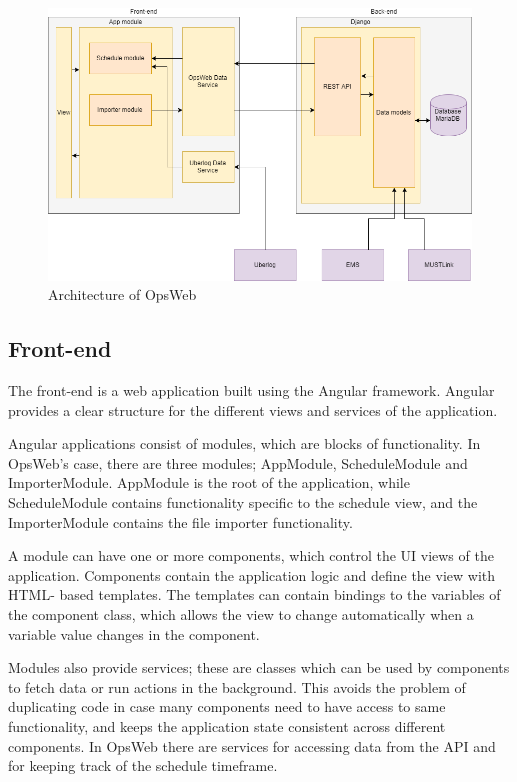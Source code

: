 \begin{figure}[ht]
  \begin{center}
    \includegraphics*[width=1\textwidth]{Architecture}
  \end{center}
  \caption{Architecture of OpsWeb}
  \label{fig:architecture_diagram}
\end{figure}

\subsection{Front-end}
The front-end is a web application built using the Angular framework. \cite{angular} Angular provides a clear structure for the different views and services of the application.

Angular applications consist of modules, which are blocks of functionality. In OpsWeb's case, there are three modules; AppModule, ScheduleModule and ImporterModule. AppModule is the root of the application, while ScheduleModule contains functionality specific to the schedule view, and the ImporterModule contains the file importer functionality.

A module can have one or more components, which control the UI views of the application. Components contain the application logic and define the view with HTML- based templates. The templates can contain bindings to the variables of the component class, which allows the view to change automatically when a variable value changes in the component.

Modules also provide services; these are classes which can be used by components to fetch data or run actions in the background. This avoids the problem of duplicating code in case many components need to have access to same functionality, and keeps the application state consistent across different components. In OpsWeb there are services for accessing data from the API and for keeping track of the schedule timeframe.

